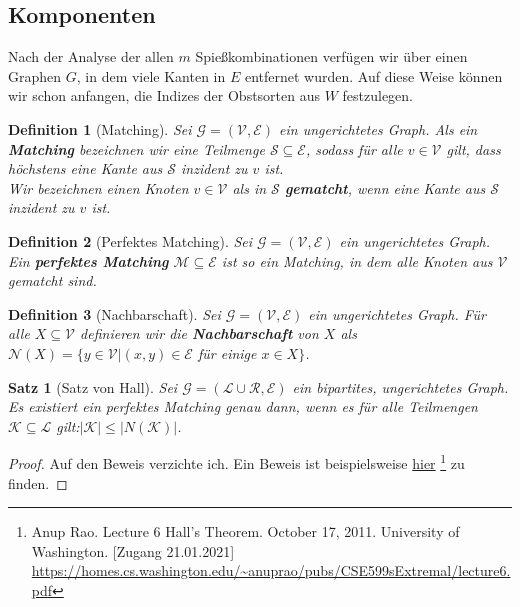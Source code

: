 \documentclass[a4paper,10pt,ngerman]{scrartcl}
\newtheorem{definition}{Definition}
\newtheorem{satz}{Satz}
\begin{document}
\subsection{Komponenten}
Nach der Analyse der allen $m$ Spießkombinationen verfügen wir über einen Graphen $G$,
in dem viele Kanten in $E$ entfernet wurden.
Auf diese Weise können wir schon anfangen, die Indizes der Obstsorten aus $W$ festzulegen.

\begin{definition}[Matching]\label{def:matching}
Sei $\mathcal{G} = (\mathcal{V}, \mathcal{E})$ ein ungerichtetes Graph.
Als ein \textbf{Matching} bezeichnen wir eine Teilmenge $\mathcal{S} \subseteq \mathcal{E}$,
sodass für alle $v \in \mathcal{V}$ gilt, dass höchstens eine Kante 
aus $\mathcal{S}$ inzident zu $v$ ist.\\
Wir bezeichnen einen Knoten $v \in \mathcal{V}$ als in $\mathcal{S}$ \textbf{gematcht},
wenn eine Kante aus $\mathcal{S}$ inzident zu $v$ ist.
\end{definition}

\begin{definition}[Perfektes Matching]\label{def:perfect-matching}
Sei $\mathcal{G} = (\mathcal{V}, \mathcal{E})$ ein ungerichtetes Graph. Ein \textbf{perfektes Matching} 
$\mathcal{M} \subseteq \mathcal{E}$ ist so ein Matching, in dem alle Knoten aus $\mathcal{V}$ gematcht sind.
\end{definition}

\begin{definition}[Nachbarschaft]\label{def:nachbarschaft}
Sei $\mathcal{G} = (\mathcal{V}, \mathcal{E})$ ein ungerichtetes Graph.
Für alle $X \subseteq \mathcal{V}$ definieren wir die \textbf{Nachbarschaft}
von $X$ als $\mathcal{N}(X) = \{y \in \mathcal{V}| (x, y) \in \mathcal{E}$ für einige $x \in X\}$.
\end{definition}

\begin{satz}[Satz von Hall]
Sei $\mathcal{G} = (\mathcal{L} \cup \mathcal{R}, \mathcal{E})$ ein bipartites, ungerichtetes Graph.
Es existiert ein perfektes Matching genau dann,
wenn es für alle Teilmengen $\mathcal{K} \subseteq \mathcal{L}$ gilt:$|\mathcal{K}| \leqslant |N(\mathcal{K})|$.
\end{satz}

\begin{proof}
Auf den Beweis verzichte ich. Ein Beweis ist beispielsweise
\href{https://homes.cs.washington.edu/~anuprao/pubs/CSE599sExtremal/lecture6.pdf}{hier}
\footnote{Anup Rao. Lecture 6 Hall’s Theorem. October 17, 2011. University of Washington. [Zugang 21.01.2021]\\
\url{https://homes.cs.washington.edu/~anuprao/pubs/CSE599sExtremal/lecture6.pdf}} zu finden.
\end{proof}
\end{document}
